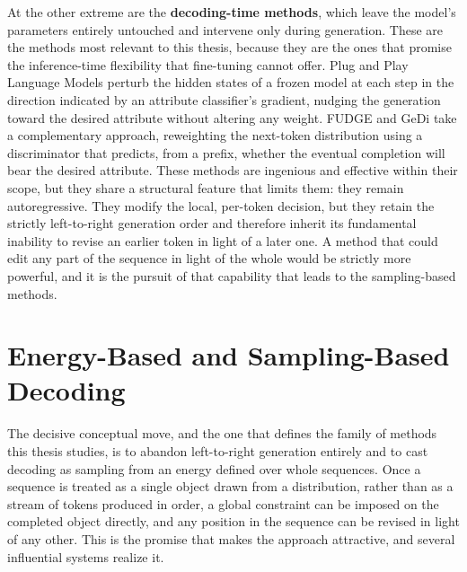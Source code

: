 At the other extreme are the \textbf{decoding-time methods}, which leave the model's parameters entirely untouched and intervene only during generation. These are the methods most relevant to this thesis, because they are the ones that promise the inference-time flexibility that fine-tuning cannot offer. Plug and Play Language Models \citep{dathathri2020plug} perturb the hidden states of a frozen model at each step in the direction indicated by an attribute classifier's gradient, nudging the generation toward the desired attribute without altering any weight. FUDGE \citep{yang2021fudge} and GeDi \citep{krause2021gedi} take a complementary approach, reweighting the next-token distribution using a discriminator that predicts, from a prefix, whether the eventual completion will bear the desired attribute. These methods are ingenious and effective within their scope, but they share a structural feature that limits them: they remain autoregressive. They modify the local, per-token decision, but they retain the strictly left-to-right generation order and therefore inherit its fundamental inability to revise an earlier token in light of a later one. A method that could edit any part of the sequence in light of the whole would be strictly more powerful, and it is the pursuit of that capability that leads to the sampling-based methods.

\section{Energy-Based and Sampling-Based Decoding}
\label{sec:rel-energy}

The decisive conceptual move, and the one that defines the family of methods this thesis studies, is to abandon left-to-right generation entirely and to cast decoding as sampling from an energy defined over whole sequences. Once a sequence is treated as a single object drawn from a distribution, rather than as a stream of tokens produced in order, a global constraint can be imposed on the completed object directly, and any position in the sequence can be revised in light of any other. This is the promise that makes the approach attractive, and several influential systems realize it.

